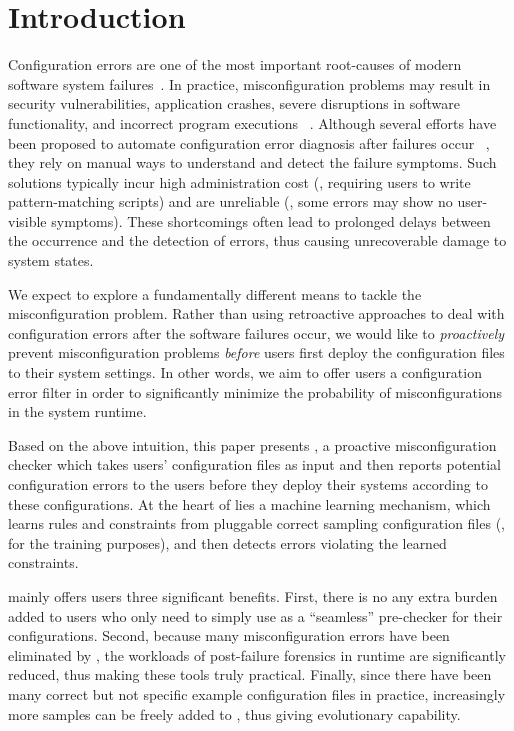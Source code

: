 \section{Introduction}

Configuration errors are one of the most important root-causes of 
modern software system failures~\cite{xu15systems,yin11anempirical}. 
In practice, misconfiguration problems may result in 
security vulnerabilities,
application crashes, severe disruptions in software functionality,
and incorrect program executions%
~\cite{xu15systems,zhang14encore,yuan11context}.
Although several efforts have been proposed to automate configuration
error diagnosis after failures occur%
~\cite{wang04automatic,attariyan10automating,%
su07autobash,whitaker04configuration}, 
they rely on manual ways to understand and detect the failure symptoms.
Such solutions typically incur high administration cost (\eg, 
requiring users to write pattern-matching scripts) 
and are unreliable (\eg, some errors may show no user-visible symptoms).
These shortcomings often lead to prolonged delays between
the occurrence and the detection of errors, thus causing unrecoverable
damage to system states.

We expect to explore a fundamentally different means to tackle 
the misconfiguration problem. Rather than using retroactive approaches
to deal with configuration errors after the software failures occur, 
we would like to {\em proactively} prevent misconfiguration problems 
{\em before} users first deploy the configuration files to 
their system settings. In other words, we aim to offer users 
a configuration error filter in order to significantly minimize 
the probability of misconfigurations in the system runtime.

Based on the above intuition, this paper presents \app, 
a proactive misconfiguration checker which takes users' 
configuration files as input and then reports potential configuration 
errors to the users before they deploy their systems 
according to these configurations.
At the heart of \app lies a machine learning mechanism, 
which learns rules and constraints from pluggable 
correct sampling configuration files (\ie, for the training purposes), 
and then detects errors violating the learned constraints.

\app mainly offers users three significant benefits.
First, there is no any extra burden added to users who only need to 
simply use \app as a ``seamless'' pre-checker for their configurations.
Second, because many misconfiguration errors have been eliminated 
by \app, the workloads of post-failure forensics in runtime
are significantly reduced, thus making these tools truly practical.
Finally, since there have been many correct but not specific 
example configuration files in practice, 
increasingly more samples can be freely added to \app,
thus giving \app evolutionary capability.

